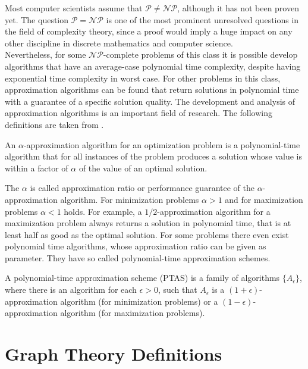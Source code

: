 Most computer scientists assume that $\mathcal{P} \neq \mathcal{NP}$, although it has not been proven yet. The question $\mathcal{P} = \mathcal{NP}$ is one of the most prominent unresolved questions in the field of complexity theory, since a proof would imply a huge impact on any other discipline in discrete mathematics and computer science.\\

Nevertheless, for some $\mathcal{NP}$-complete problems of this class it is possible develop algorithms that have an average-case polynomial time complexity, despite having exponential time complexity in worst case. For other problems in this class, approximation algorithms can be found that return solutions in polynomial time with a guarantee of a specific solution quality. The development and analysis of approximation algorithms is an important field of research. The following definitions are taken from \cite{williamson-10}.

\begin{definition}
An $\alpha$-approximation algorithm for an optimization problem is a polynomial-time algorithm that for all instances of the problem produces a solution whose value is within a factor of $\alpha$ of the value of an optimal solution.
\end{definition}

The $\alpha$ is called approximation ratio or performance guarantee of the $\alpha$-approximation algorithm. For minimization problems $\alpha > 1$ and for maximization problems $\alpha < 1$ holds. For example, a $1/2$-approximation algorithm for a maximization problem always returns a solution in polynomial time, that is at least half as good as the optimal solution. For some problems there even exist polynomial time algorithms, whose approximation ratio can be given as parameter. They have so called polynomial-time approximation schemes.

\begin{definition}
A polynomial-time approximation scheme (PTAS) is a family of algorithms $\{A_{\epsilon}\}$, where there is an algorithm for each $\epsilon > 0$, such that $A_{\epsilon}$ is a $(1+\epsilon)$-approximation algorithm (for minimization problems) or a $(1-\epsilon)$-approximation algorithm (for maximization problems).
\end{definition}


\section{Graph Theory Definitions}

